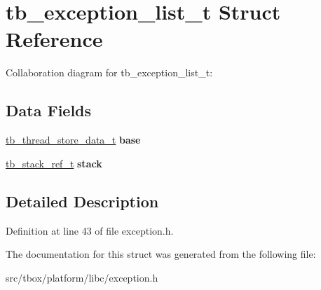 \hypertarget{structtb__exception__list__t}{\section{tb\-\_\-exception\-\_\-list\-\_\-t Struct Reference}
\label{structtb__exception__list__t}
}


Collaboration diagram for tb\-\_\-exception\-\_\-list\-\_\-t\-:
\subsection*{Data Fields}
\begin{DoxyCompactItemize}
\item 
\hypertarget{structtb__exception__list__t_a355fd43d8868f177020f207b3cbea3a3}{\hyperlink{structtb__thread__store__data__t}{tb\-\_\-thread\-\_\-store\-\_\-data\-\_\-t} {\bfseries base}}\label{structtb__exception__list__t_a355fd43d8868f177020f207b3cbea3a3}

\item 
\hypertarget{structtb__exception__list__t_a4b3d8035ffa1fcff37906645a045d727}{\hyperlink{stack_8h_a3ac59ad012c8213ed53ac663cf00d324}{tb\-\_\-stack\-\_\-ref\-\_\-t} {\bfseries stack}}\label{structtb__exception__list__t_a4b3d8035ffa1fcff37906645a045d727}

\end{DoxyCompactItemize}


\subsection{Detailed Description}


Definition at line 43 of file exception.\-h.



The documentation for this struct was generated from the following file\-:\begin{DoxyCompactItemize}
\item 
src/tbox/platform/libc/exception.\-h\end{DoxyCompactItemize}
